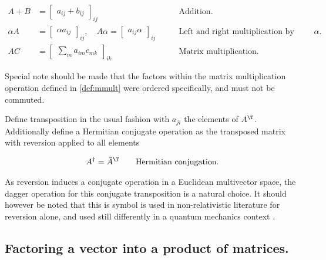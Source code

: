 \begin{definition}
\begin{subequations}
\begin{align}\label{eqn:mp90}
A + B &= 
{\begin{bmatrix}
a_{ij} + b_{ij}
\end{bmatrix}}_{ij} & \qquad \mbox{Addition.} 
\\
\alpha A &= 
{\begin{bmatrix}
\alpha a_{ij} 
\end{bmatrix}}_{ij}, \quad
A \alpha = 
{\begin{bmatrix}
a_{ij} \alpha
\end{bmatrix}}_{ij}
& \qquad \mbox{Left and right multiplication by multivector $\alpha$.} 
\\
A C &= 
{\begin{bmatrix}
\sum_m 
a_{im} c_{mk} 
\end{bmatrix}}_{ik} & \qquad \mbox{Matrix multiplication.} \label{def:mmult}
\end{align}
\end{subequations}
\end{definition}

Special note should be made that the factors within the matrix multiplication operation defined in \ref{def:mmult} were ordered specifically, and must not be commuted.

Define transposition in the usual fashion with $a_{ji}$ the elements of $A^\T$.  Additionally define a Hermitian conjugate operation as the transposed matrix with reversion applied to all elements

\begin{definition}
\begin{align}\label{eqn:mp100}
A^\dagger = {\tilde{A}}^\T \qquad \mbox{Hermitian conjugation.}
\end{align}
\end{definition}

As reversion induces a conjugate operation in a Euclidean multivector space, the dagger operation for this conjugate transposition is a natural choice.  It should however be noted that this is symbol is used in non-relativistic literature \cite{hestenes1999nfc} for reversion alone, and used still differently in a quantum mechanics context \cite{doran2003gap}.

\subsection{Factoring a vector into a product of matrices.}

